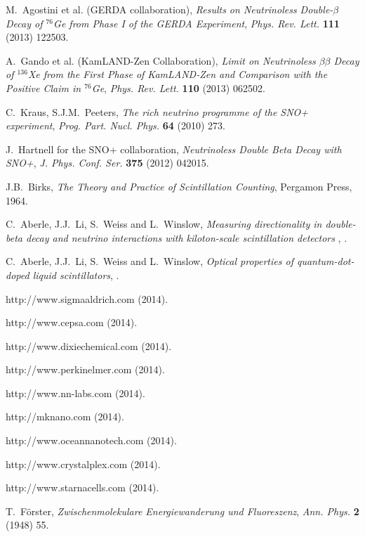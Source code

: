\documentclass{JINST}
\begin{document}
\begin{thebibliography}{35}
M.~Agostini et al. (GERDA collaboration), \emph{Results on Neutrinoless Double-$\beta$ Decay of $^{76}$Ge from Phase I of the GERDA Experiment}, \emph{Phys. Rev. Lett.} {\bf 111} (2013) 122503. 

A.~Gando et al. (KamLAND-Zen Collaboration), \emph{Limit on Neutrinoless $\beta\beta$ Decay of $^{136}$Xe from the First Phase of KamLAND-Zen and Comparison with the Positive Claim in $^{76}$Ge}, \emph{Phys. Rev. Lett.} {\bf 110} (2013) 062502.

C.~Kraus, S.J.M.~Peeters, \emph{The rich neutrino programme of the SNO+ experiment}, \emph{Prog. Part. Nucl. Phys.} {\bf 64} (2010) 273.

J.~Hartnell for the SNO+ collaboration, \emph{Neutrinoless Double Beta Decay with SNO+}, \emph{J. Phys. Conf. Ser.} {\bf 375} (2012) 042015.

J.B.~Birks, \emph{The Theory and Practice of Scintillation Counting}, Pergamon Press, 1964.

C.~Aberle, J.J.~Li, S.~Weiss and L.~Winslow, \emph{Measuring directionality in double-beta decay and neutrino interactions with kiloton-scale scintillation detectors }, .

C.~Aberle, J.J.~Li, S.~Weiss and L.~Winslow, \emph{Optical properties of quantum-dot-doped liquid scintillators}, .

http://www.sigmaaldrich.com (2014).

http://www.cepsa.com (2014). 

http://www.dixiechemical.com (2014).

http://www.perkinelmer.com (2014).

http://www.nn-labs.com (2014).

http://mknano.com (2014).

 http://www.oceannanotech.com (2014).
 
 http://www.crystalplex.com (2014).

http://www.starnacells.com (2014).  

T.~F\"orster, \emph{Zwischenmolekulare Energiewanderung und Fluoreszenz}, \emph{Ann. Phys.} {\bf 2} (1948) 55.


\end{thebibliography}
\end{document}
